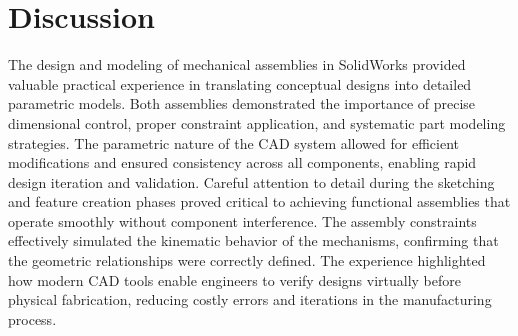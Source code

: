 \section{Discussion}

The design and modeling of mechanical assemblies in SolidWorks provided valuable practical experience in translating conceptual designs into detailed parametric models. Both assemblies demonstrated the importance of precise dimensional control, proper constraint application, and systematic part modeling strategies. The parametric nature of the CAD system allowed for efficient modifications and ensured consistency across all components, enabling rapid design iteration and validation. Careful attention to detail during the sketching and feature creation phases proved critical to achieving functional assemblies that operate smoothly without component interference. The assembly constraints effectively simulated the kinematic behavior of the mechanisms, confirming that the geometric relationships were correctly defined. The experience highlighted how modern CAD tools enable engineers to verify designs virtually before physical fabrication, reducing costly errors and iterations in the manufacturing process.

